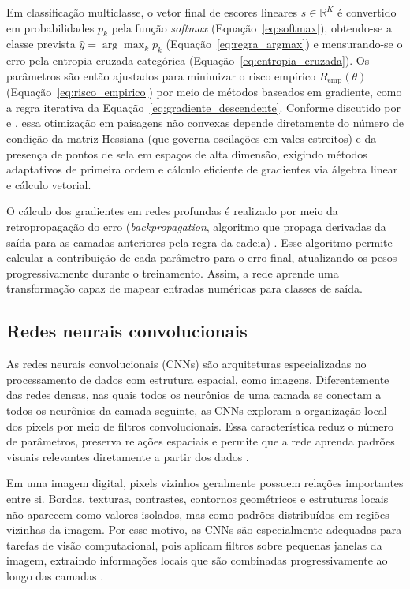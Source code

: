 \documentclass[
    12pt,
    openright,
    oneside,
    a4paper,
    english,
    brazil
]{abntex2}
\begin{document}
Em classificação multiclasse, o vetor final de escores lineares \(s \in \mathbb{R}^{K}\) é convertido em probabilidades \(p_k\) pela função \textit{softmax} (Equação~\eqref{eq:softmax}), obtendo-se a classe prevista \(\hat{y} = \arg\max_k p_k\) (Equação~\eqref{eq:regra_argmax}) e mensurando-se o erro pela entropia cruzada categórica (Equação~\eqref{eq:entropia_cruzada}). Os parâmetros são então ajustados para minimizar o risco empírico \(R_{\text{emp}}(\theta)\) (Equação~\eqref{eq:risco_empirico}) por meio de métodos baseados em gradiente, como a regra iterativa da Equação~\eqref{eq:gradiente_descendente}. Conforme discutido por  e , essa otimização em paisagens não convexas depende diretamente do número de condição da matriz Hessiana (que governa oscilações em vales estreitos) e da presença de pontos de sela em espaços de alta dimensão, exigindo métodos adaptativos de primeira ordem e cálculo eficiente de gradientes via álgebra linear e cálculo vetorial.

O cálculo dos gradientes em redes profundas é realizado por meio da retropropagação do erro (\textit{backpropagation}, algoritmo que propaga derivadas da saída para as camadas anteriores pela regra da cadeia) \cite{rumelhart1986backprop,goodfellow2016deep}. Esse algoritmo permite calcular a contribuição de cada parâmetro para o erro final, atualizando os pesos progressivamente durante o treinamento. Assim, a rede aprende uma transformação capaz de mapear entradas numéricas para classes de saída.

\subsection{Redes neurais convolucionais}
\label{subsec:redes_neurais_convolucionais}

As redes neurais convolucionais (CNNs) são arquiteturas especializadas no processamento de dados com estrutura espacial, como imagens. Diferentemente das redes densas, nas quais todos os neurônios de uma camada se conectam a todos os neurônios da camada seguinte, as CNNs exploram a organização local dos pixels por meio de filtros convolucionais. Essa característica reduz o número de parâmetros, preserva relações espaciais e permite que a rede aprenda padrões visuais relevantes diretamente a partir dos dados \cite{LeCun2015,lecun1998gradient,goodfellow2016deep}.

Em uma imagem digital, pixels vizinhos geralmente possuem relações importantes entre si. Bordas, texturas, contrastes, contornos geométricos e estruturas locais não aparecem como valores isolados, mas como padrões distribuídos em regiões vizinhas da imagem. Por esse motivo, as CNNs são especialmente adequadas para tarefas de visão computacional, pois aplicam filtros sobre pequenas janelas da imagem, extraindo informações locais que são combinadas progressivamente ao longo das camadas \cite{LeCun2015,gonzalez2008digital}.
\end{document}
